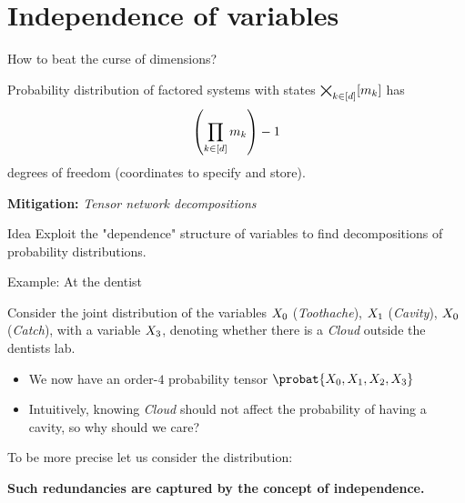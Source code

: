 \documentclass{beamer}
\begin{document}
    {\frame[plain]{\titlepage}}
    \showoutlineatsection


    \section{Independence of variables}


    \begin{frame}{How to beat the curse of dimensions?}

        Probability distribution of factored systems with states $\bigtimes_{k\in[d]}[m_{k}]$ has
        \[\left(\prod_{k\in[d]}m_{k}\right) -1 \]
        degrees of freedom (coordinates to specify and store).

        \medskip

        {\bf Mitigation:} \emph{Tensor network decompositions}

        \begin{block}{Idea}
            Exploit the "dependence" structure of variables to find decompositions of probability distributions.
        \end{block}

    \end{frame}



    \begin{frame}{Example: At the dentist}

        Consider the joint distribution of the variables $X_{0}$ (\emph{Toothache}), $X_{1}$ (\emph{Cavity}), $X_{0}$ (\emph{Catch}),  with a variable $X_{3}$, denoting whether there is a \emph{Cloud} outside the dentists lab.
        \begin{itemize}
            \item We now have an order-$4$ probability tensor $\probat{\catvariableof{0},\catvariableof{1},\catvariableof{2},\catvariableof{3}}$
            \item Intuitively, knowing \emph{Cloud} should not affect the probability of having a cavity, so why should we care?
        \end{itemize}

        To be more precise let us consider the distribution:
        

        \begin{center}
            \bf Such redundancies are captured by the concept of independence.
        \end{center}


    \end{frame}
\end{document}
